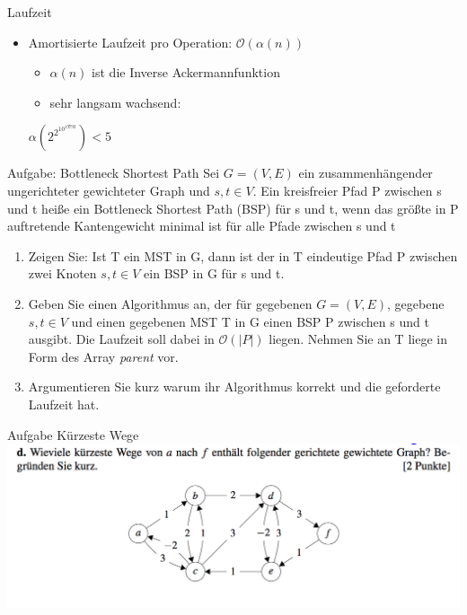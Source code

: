 \begin{frame}{Laufzeit}
	\begin{itemize}
		\item Amortisierte Laufzeit pro Operation: $\mathcal{O}(\alpha(n))$
		\begin{itemize}
			\item $\alpha(n)$ ist die Inverse Ackermannfunktion
			\item sehr langsam wachsend:
		\end{itemize}
		\centerline{$\alpha( 2 ^ {2 ^{10 ^{19792}}}) < 5$}
	\end{itemize}
\end{frame}



\begin{frame}{Aufgabe: Bottleneck Shortest Path}
	Sei $G = (V, E)$ ein zusammenhängender ungerichteter gewichteter Graph und $s, t \in V$. Ein kreisfreier Pfad P zwischen s und t heiße ein Bottleneck Shortest Path (BSP) für s und t,
	wenn das größte in P auftretende Kantengewicht minimal ist für alle Pfade zwischen s und t
	\begin{enumerate}
		\item Zeigen Sie: Ist T ein MST in G, dann ist der in T eindeutige Pfad P zwischen zwei Knoten $s, t \in V$ ein BSP in G für s und t.
		\item Geben Sie einen Algorithmus an, der für gegebenen $G = (V, E)$, gegebene $s, t \in V$ und einen gegebenen MST T in G einen BSP P zwischen s und t ausgibt.
		Die Laufzeit soll dabei in $\mathcal{O}(|P|)$ liegen.
		Nehmen Sie an T liege in Form des Array \textit{parent} vor.
		\item Argumentieren Sie kurz warum ihr Algorithmus korrekt und die geforderte Laufzeit hat.
	\end{enumerate}

\end{frame}

\begin{frame}{Aufgabe Kürzeste Wege}
	\includegraphics[width=\textwidth]{images/shortestPath01}
\end{frame}


